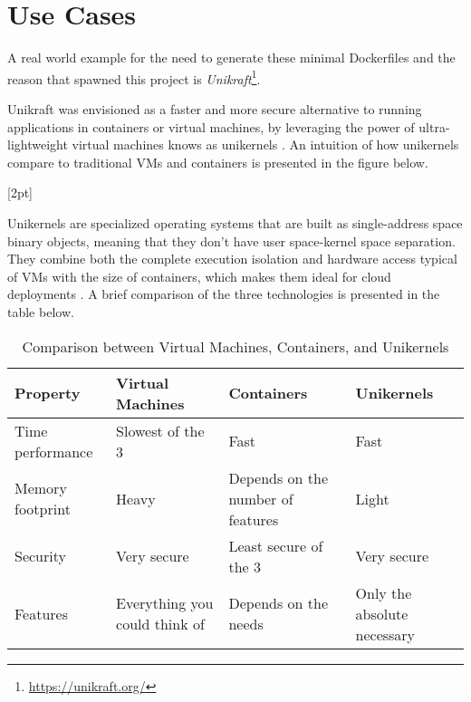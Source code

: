 \chapter{Use Cases}
\label{chapter:use-cases}

A real world example for the need to generate these minimal Dockerfiles and
the reason that spawned this project is \textit{Unikraft}\footnote[1]{\url{https://unikraft.org/}}.

Unikraft was envisioned as a faster and more secure alternative to running applications in containers or virtual machines, by
leveraging the power of ultra-lightweight virtual machines knows as unikernels \cite{unikraft}.
An intuition of how unikernels compare to traditional VMs and containers is presented in the figure below.   

[2pt]

Unikernels are specialized operating systems that are built as single-address space binary objects, meaning that they don't 
have user space-kernel space separation. They combine both the complete execution isolation and hardware access typical of VMs with the size of containers,
which makes them ideal for cloud deployments  \cite{unikraft}. A brief comparison of the three technologies is presented in the table below.

\begin{table}[ht]
\centering
\small
\begin{tabular}{|l|p{3cm}|p{3cm}|p{3cm}|}
\hline
\textbf{Property} & \textbf{Virtual Machines} & \textbf{Containers} & \textbf{Unikernels} \\
\hline
Time performance & Slowest of the 3 & Fast & Fast \\
\hline
Memory footprint & Heavy & Depends on the number of features & Light \\
\hline
Security & Very secure & Least secure of the 3 & Very secure \\
\hline
Features & Everything you could think of & Depends on the needs & Only the absolute necessary \\
\hline
\end{tabular}
\caption{Comparison between Virtual Machines, Containers, and Unikernels \cite{unikraft}}
\label{tab:vm-container-unikernel-comparison}
\end{table}


